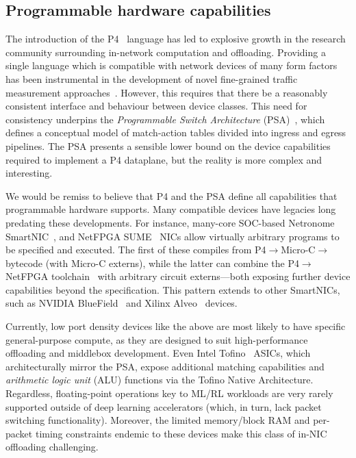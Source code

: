 \documentclass[sigconf,natbib=false]{acmart}
\begin{document}
\subsection{Programmable hardware capabilities}
The introduction of the P4~\parencite{DBLP:journals/ccr/BosshartDGIMRSTVVW14} language has led to explosive growth in the research community surrounding in-network computation and offloading.
Providing a single language which is compatible with network devices of many form factors has been instrumental in the development of novel fine-grained traffic measurement approaches~\parencite{DBLP:conf/sigcomm/GuptaHCFRW18,DBLP:conf/sigcomm/ChenFKRR18,DBLP:conf/sosr/GhasemiBR17}.
However, this requires that there be a reasonably consistent interface and behaviour between device classes.
This need for consistency underpins the \emph{Programmable Switch Architecture} (PSA)~\parencite{p4-psa}, which defines a conceptual model of match-action tables divided into ingress and egress pipelines.
The PSA presents a sensible lower bound on the device capabilities required to implement a P4 dataplane, but the reality is more complex and interesting.

We would be remiss to believe that P4 and the PSA define all capabilities that programmable hardware supports.
Many compatible devices have legacies long predating these developments. 
For instance, many-core SOC-based Netronome SmartNIC~\parencite{netronome-smartnic}, and NetFPGA SUME~\parencite{DBLP:journals/micro/ZilbermanACM14} NICs allow virtually arbitrary programs to be specified and executed.
The first of these compiles from P4$\rightarrow$Micro-C$\rightarrow$bytecode (with Micro-C externs), while the latter can combine the P4$\rightarrow$NetFPGA toolchain~\parencite{DBLP:conf/fpga/IbanezBMZ19} with arbitrary circuit externs---both exposing further device capabilities beyond the specification.
This pattern extends to other SmartNICs, such as NVIDIA BlueField~\parencite{nvidia-bluefield} and Xilinx Alveo~\parencite{xilinx-alveo} devices.

Currently, low port density devices like the above are most likely to have specific general-purpose compute, as they are designed to suit high-performance offloading and middlebox development.
Even Intel Tofino~\parencite{barefoot-intel} ASICs, which architecturally mirror the PSA, expose additional matching capabilities and \emph{arithmetic logic unit} (ALU) functions via the Tofino Native Architecture.
Regardless, floating-point operations key to ML/RL workloads are very rarely supported outside of deep learning accelerators (which, in turn, lack packet switching functionality).
Moreover, the limited memory/block RAM and per-packet timing constraints endemic to these devices make this class of in-NIC offloading challenging.
\end{document}
